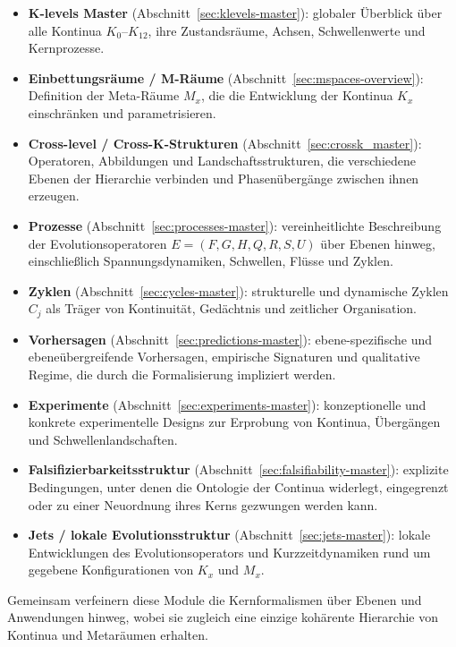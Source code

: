 \begin{itemize}
\item \textbf{K-levels Master} (Abschnitt~\ref{sec:klevels-master}):
  globaler Überblick über alle Kontinua \(K_0\)–\(K_{12}\), ihre Zustandsräume,
  Achsen, Schwellenwerte und Kernprozesse.

\item \textbf{Einbettungsräume / M-Räume} (Abschnitt~\ref{sec:mspaces-overview}):
  Definition der Meta-Räume \(M_x\), die die Entwicklung der Kontinua \(K_x\)
  einschränken und parametrisieren.

\item \textbf{Cross-level / Cross-K-Strukturen} (Abschnitt~\ref{sec:crossk_master}):
  Operatoren, Abbildungen und Landschaftsstrukturen, die verschiedene Ebenen der
  Hierarchie verbinden und Phasenübergänge zwischen ihnen erzeugen.

\item \textbf{Prozesse} (Abschnitt~\ref{sec:processes-master}):
  vereinheitlichte Beschreibung der Evolutionsoperatoren \(E = (F,G,H,Q,R,S,U)\)
  über Ebenen hinweg, einschließlich Spannungsdynamiken, Schwellen, Flüsse und
  Zyklen.

\item \textbf{Zyklen} (Abschnitt~\ref{sec:cycles-master}):
  strukturelle und dynamische Zyklen \(C_j\) als Träger von Kontinuität,
  Gedächtnis und zeitlicher Organisation.

\item \textbf{Vorhersagen} (Abschnitt~\ref{sec:predictions-master}):
  ebene-spezifische und ebeneübergreifende Vorhersagen, empirische Signaturen und
  qualitative Regime, die durch die Formalisierung impliziert werden.

\item \textbf{Experimente} (Abschnitt~\ref{sec:experiments-master}):
  konzeptionelle und konkrete experimentelle Designs zur Erprobung von Kontinua,
  Übergängen und Schwellenlandschaften.

\item \textbf{Falsifizierbarkeitsstruktur} (Abschnitt~\ref{sec:falsifiability-master}):
  explizite Bedingungen, unter denen die Ontologie der Continua widerlegt,
  eingegrenzt oder zu einer Neuordnung ihres Kerns gezwungen werden kann.

\item \textbf{Jets / lokale Evolutionsstruktur} (Abschnitt~\ref{sec:jets-master}):
  lokale Entwicklungen des Evolutionsoperators und Kurzzeitdynamiken rund um
  gegebene Konfigurationen von \(K_x\) und \(M_x\).
\end{itemize}

Gemeinsam verfeinern diese Module die Kernformalismen über Ebenen und Anwendungen
hinweg, wobei sie zugleich eine einzige kohärente Hierarchie von Kontinua und
Metaräumen erhalten.
